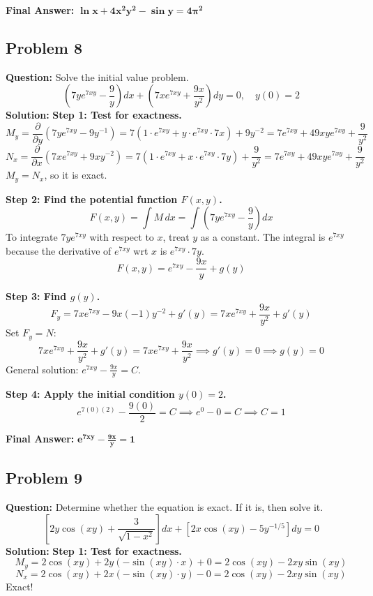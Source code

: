 \documentclass[11pt]{article}
\begin{document}
\textbf{Final Answer:} $\mathbf{\ln x + 4x^2 y^2 - \sin y = 4\pi^2}$

\vspace{0.5cm}
\subsection*{Problem 8}
\textbf{Question:} Solve the initial value problem.
\[ \left( 7y e^{7xy} - \frac{9}{y} \right) dx + \left( 7x e^{7xy} + \frac{9x}{y^2} \right) dy = 0, \quad y(0) = 2 \]
\textbf{Solution:}
\textbf{Step 1: Test for exactness.}
\[ M_y = \frac{\partial}{\partial y}\left(7y e^{7xy} - 9y^{-1}\right) = 7\left(1 \cdot e^{7xy} + y \cdot e^{7xy} \cdot 7x\right) + 9y^{-2} = 7e^{7xy} + 49xy e^{7xy} + \frac{9}{y^2} \]
\[ N_x = \frac{\partial}{\partial x}\left(7x e^{7xy} + 9xy^{-2}\right) = 7\left(1 \cdot e^{7xy} + x \cdot e^{7xy} \cdot 7y\right) + \frac{9}{y^2} = 7e^{7xy} + 49xy e^{7xy} + \frac{9}{y^2} \]
$M_y = N_x$, so it is exact.

\textbf{Step 2: Find the potential function $F(x,y)$.}
\[ F(x, y) = \int M \, dx = \int \left( 7y e^{7xy} - \frac{9}{y} \right) dx \]
To integrate $7y e^{7xy}$ with respect to $x$, treat $y$ as a constant. The integral is $e^{7xy}$ because the derivative of $e^{7xy}$ wrt $x$ is $e^{7xy} \cdot 7y$.
\[ F(x, y) = e^{7xy} - \frac{9x}{y} + g(y) \]

\textbf{Step 3: Find $g(y)$.}
\[ F_y = 7x e^{7xy} - 9x(-1)y^{-2} + g'(y) = 7x e^{7xy} + \frac{9x}{y^2} + g'(y) \]
Set $F_y = N$:
\[ 7x e^{7xy} + \frac{9x}{y^2} + g'(y) = 7x e^{7xy} + \frac{9x}{y^2} \implies g'(y) = 0 \implies g(y) = 0 \]
General solution: $e^{7xy} - \frac{9x}{y} = C$.

\textbf{Step 4: Apply the initial condition $y(0) = 2$.}
\[ e^{7(0)(2)} - \frac{9(0)}{2} = C \implies e^0 - 0 = C \implies C = 1 \]

\textbf{Final Answer:} $\mathbf{e^{7xy} - \frac{9x}{y} = 1}$

\vspace{0.5cm}
\subsection*{Problem 9}
\textbf{Question:} Determine whether the equation is exact. If it is, then solve it.
\[ \left[ 2y \cos(xy) + \frac{3}{\sqrt{1-x^2}} \right] dx + \left[ 2x \cos(xy) - 5y^{-1/5} \right] dy = 0 \]
\textbf{Solution:}
\textbf{Step 1: Test for exactness.}
\[ M_y = 2\cos(xy) + 2y(-\sin(xy) \cdot x) + 0 = 2\cos(xy) - 2xy \sin(xy) \]
\[ N_x = 2\cos(xy) + 2x(-\sin(xy) \cdot y) - 0 = 2\cos(xy) - 2xy \sin(xy) \]
Exact!
\end{document}
